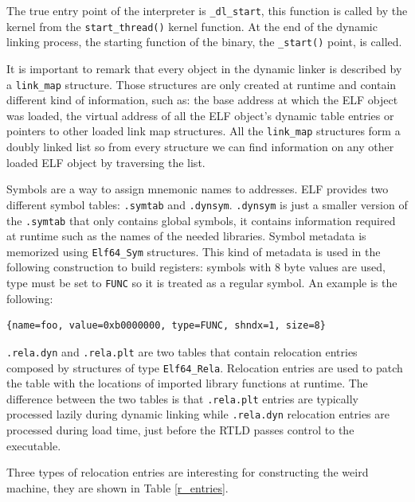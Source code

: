 \documentclass[11pt,twoside,a4paper]{article}
\begin{document}
The true entry point of the interpreter is \texttt{\_dl\_start}, this function is called by the kernel from the \texttt{start\_thread()} kernel function. At the end of the dynamic linking process, the starting function of the binary, the \texttt{\_start()} point, is called. \cite{eresi}

It is important to remark that every object in the dynamic linker is described by a \texttt{link\_map} structure. Those structures are only created at runtime and contain different kind of information, such as: the base address at which the ELF object was loaded, the virtual address of all the ELF object's dynamic table entries or pointers to other loaded link map structures. All the \texttt{link\_map} structures form a doubly linked list so from every structure we can find information on any other loaded ELF object by traversing the list.

Symbols are a way to assign mnemonic names to addresses. ELF provides two different symbol tables: \texttt{.symtab} and \texttt{.dynsym}. \texttt{.dynsym} is just a smaller version of the \texttt{.symtab} that only contains global symbols, it contains information required at runtime such as the names of the needed libraries. Symbol metadata is memorized using \texttt{Elf64\_Sym} structures. This kind of metadata is used in the following construction to build registers: symbols with 8 byte values are used, type must be set to \texttt{FUNC} so it is treated as a regular symbol. An example is the following: \begin{lstlisting}
{name=foo, value=0xb0000000, type=FUNC, shndx=1, size=8}
\end{lstlisting}

\texttt{.rela.dyn} and \texttt{.rela.plt} are two tables that contain relocation entries composed by structures of type \texttt{Elf64\_Rela}. Relocation entries are used to patch the table with the locations of imported library functions at runtime. The difference between the two tables is that \texttt{.rela.plt} entries are typically processed lazily during dynamic linking while \texttt{.rela.dyn} relocation entries are processed during load time, just before the RTLD passes control to the executable.

Three types of relocation entries are interesting for constructing the weird machine, they are shown in Table \ref{r_entries}.
\end{document}
